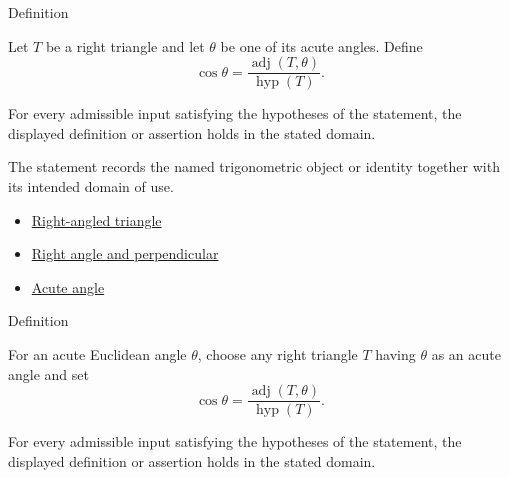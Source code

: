 

\begin{definitionbox}{Definition}
\begin{definition}
\label{def:right-triangle-cosine}
Let $T$ be a right triangle and let $\theta$ be one of its acute angles. Define
\[
\cos\theta=\frac{\operatorname{adj}(T,\theta)}{\operatorname{hyp}(T)}.
\]
\end{definition}
\end{definitionbox}
\begin{remark*}
For every admissible input satisfying the hypotheses of the statement, the
displayed definition or assertion holds in the stated domain.
\end{remark*}

\begin{remark*}[Interpretation]
The statement records the named trigonometric object or identity together with
its intended domain of use.
\end{remark*}

\begin{dependencies}
\begin{itemize}
  \item \hyperref[def:euclid-triangle-angle-classes]{Right-angled triangle}
  \item \hyperref[def:euclid-right-angle-and-perpendicular]{Right angle and perpendicular}
  \item \hyperref[def:euclid-acute-angle]{Acute angle}
\end{itemize}
\end{dependencies}



\begin{definitionbox}{Definition}
\begin{definition}
\label{def:acute-angle-cosine}
For an acute Euclidean angle $\theta$, choose any right triangle $T$ having
$\theta$ as an acute angle and set
\[
  \cos\theta=\frac{\operatorname{adj}(T,\theta)}{\operatorname{hyp}(T)}.
\]
\end{definition}
\end{definitionbox}
\begin{remark*}
For every admissible input satisfying the hypotheses of the statement, the
displayed definition or assertion holds in the stated domain.
\end{remark*}


